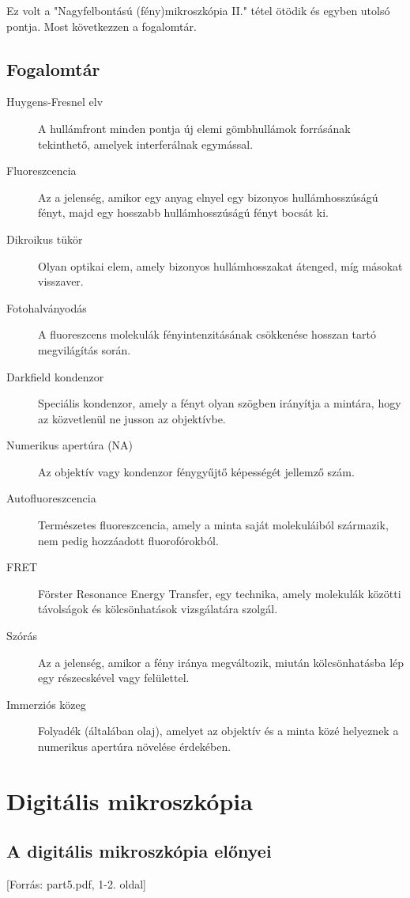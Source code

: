 \documentclass[a4paper,12pt]{article}
\begin{document}
Ez volt a "Nagyfelbontású (fény)mikroszkópia II." tétel ötödik és egyben utolsó pontja. Most következzen a fogalomtár.

\subsection{Fogalomtár} 

\begin{description} \item[Huygens-Fresnel elv] A hullámfront minden pontja új elemi gömbhullámok forrásának tekinthető, amelyek interferálnak egymással.

\item[Fluoreszcencia] Az a jelenség, amikor egy anyag elnyel egy bizonyos hullámhosszúságú fényt, majd egy hosszabb hullámhosszúságú fényt bocsát ki. \item[Dikroikus tükör] Olyan optikai elem, amely bizonyos hullámhosszakat átenged, míg másokat visszaver. \item[Fotohalványodás] A fluoreszcens molekulák fényintenzitásának csökkenése hosszan tartó megvilágítás során. \item[Darkfield kondenzor] Speciális kondenzor, amely a fényt olyan szögben irányítja a mintára, hogy az közvetlenül ne jusson az objektívbe. \item[Numerikus apertúra (NA)] Az objektív vagy kondenzor fénygyűjtő képességét jellemző szám. \item[Autofluoreszcencia] Természetes fluoreszcencia, amely a minta saját molekuláiból származik, nem pedig hozzáadott fluorofórokból. \item[FRET] Förster Resonance Energy Transfer, egy technika, amely molekulák közötti távolságok és kölcsönhatások vizsgálatára szolgál. \item[Szórás] Az a jelenség, amikor a fény iránya megváltozik, miután kölcsönhatásba lép egy részecskével vagy felülettel. \item[Immerziós közeg] Folyadék (általában olaj), amelyet az objektív és a minta közé helyeznek a numerikus apertúra növelése érdekében.
\end{description}

\newpage

\section{Digitális mikroszkópia}

\subsection{A digitális mikroszkópia előnyei} [Forrás: part5.pdf, 1-2. oldal]
\end{document}
